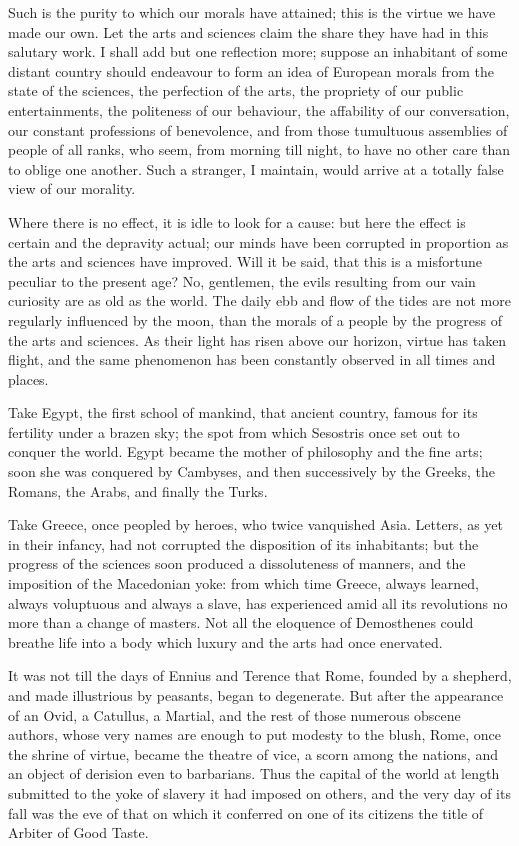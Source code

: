 Such is the purity to which our morals have attained; this is the
virtue we have made our own. Let the arts and sciences claim the share
they have had in this salutary work. I shall add but one reflection
more; suppose an inhabitant of some distant country should endeavour
to form an idea of European morals from the state of the sciences, the
perfection of the arts, the propriety of our public entertainments,
the politeness of our behaviour, the affability of our conversation,
our constant professions of benevolence, and from those tumultuous
assemblies of people of all ranks, who seem, from morning till night,
to have no other care than to oblige one another. Such a stranger, I
maintain, would arrive at a totally false view of our morality.

Where there is no effect, it is idle to look for a cause: but here the
effect is certain and the depravity actual; our minds have been
corrupted in proportion as the arts and sciences have improved. Will
it be said, that this is a misfortune peculiar to the present age? No,
gentlemen,  the evils resulting from our vain curiosity are
as old as the world. The daily ebb and flow of the tides are not more
regularly influenced by the moon, than the morals of a people by the
progress of the arts and sciences. As their light has risen above our
horizon, virtue has taken flight, and the same phenomenon has been
constantly observed in all times and places.

Take Egypt, the first school of mankind, that ancient country, famous
for its fertility under a brazen sky; the spot from which Sesostris
once set out to conquer the world. Egypt became the mother of
philosophy and the fine arts; soon she was conquered by Cambyses, and
then successively by the Greeks, the Romans, the Arabs, and finally
the Turks.

Take Greece, once peopled by heroes, who twice vanquished Asia.
Letters, as yet in their infancy, had not corrupted the disposition of
its inhabitants; but the progress of the sciences soon produced a
dissoluteness of manners, and the imposition of the Macedonian yoke:
from which time Greece, always learned, always voluptuous and always a
slave, has experienced amid all its revolutions no more than a change
of masters. Not all the eloquence of Demosthenes could breathe life
into a body which luxury and the arts had once enervated.

It was not till the days of Ennius and Terence that Rome, founded by a
shepherd, and made illustrious by peasants, began to degenerate. But
after the appearance of an Ovid, a Catullus, a Martial, and the rest
of those numerous obscene authors, whose very names are enough to put
modesty to the blush, Rome, once the shrine of virtue, became the
theatre of vice, a scorn among the nations, and an object of derision
even to barbarians. Thus the capital of the world at length submitted
to the yoke of slavery it had imposed on others, and the very day of
its fall was the eve of that on which it conferred on one of its
citizens the title of Arbiter of Good Taste.

